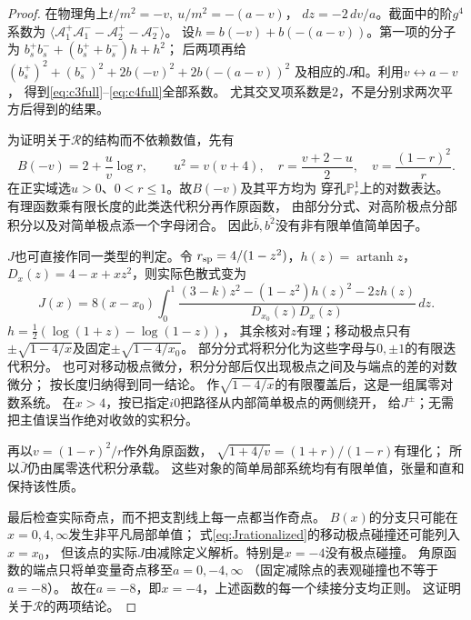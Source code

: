 \documentclass[11pt,a4paper]{ctexart}
\theoremstyle{cnplain}\newtheorem{theorem}{定理}[section]
\theoremstyle{definition}\newtheorem{definition}[theorem]{定义}
\theoremstyle{remark}\newtheorem{remark}[theorem]{注}
\begin{document}
\begin{proof}
在物理角上$t/m^2=-v,\ u/m^2=-(a-v)$，
$d z=-2\,dv/a$。截面中的阶$g^4$系数为
$\langle\mathcal A_1^+\mathcal A_1^--\mathcal A_2^+-\mathcal A_2^-\rangle$。
设$h=b(-v)+b(-(a-v))$。第一项的分子为
$b_s^+b_s^-+(b_s^++b_s^-)h+h^2$；
后两项再给$(b_s^+)^2+(b_s^-)^2+2b(-v)^2+2b(-(a-v))^2$
及相应的$J$和。利用$v\leftrightarrow a-v$，
得到\eqref{eq:c3full}--\eqref{eq:c4full}全部系数。
尤其交叉项系数是$2$，不是分别求两次平方后得到的结果。

为证明关于$\mathcal R$的结构而不依赖数值，先有
\[
 B(-v)=2+\frac uv\log r,\qquad
 u^2=v(v+4),\quad r=\frac{v+2-u}{2},\quad v=\frac{(1-r)^2}{r}.
\]
在正实域选$u>0$、$0<r\le1$。故$B(-v)$及其平方均为
穿孔$\mathbb P^1_r$上的对数表达。
有理函数乘有限长度的此类迭代积分再作原函数，
由部分分式、对高阶极点分部积分以及对简单极点添一个字母闭合。
因此$\bar b,\overline{b^2}$没有非有限单值简单因子。

$J$也可直接作同一类型的判定。令
$r_{\rm sp}=4/(1-z^2)$，$h(z)=\operatorname{artanh}z$，
$D_x(z)=4-x+xz^2$，则实际色散式变为
\begin{equation}\label{eq:Jrationalized}
 J(x)=8(x-x_0)\int_0^1
 \frac{(3-k)z^2-(1-z^2)h(z)^2-2zh(z)}
      {D_{x_0}(z)D_x(z)}\,dz .
\end{equation}
$h=\frac12(\log(1+z)-\log(1-z))$，
其余核对$z$有理；移动极点只有
$\pm\sqrt{1-4/x}$及固定$\pm\sqrt{1-4/x_0}$。
部分分式将积分化为这些字母与$0,\pm1$的有限迭代积分。
也可对移动极点微分，积分分部后仅出现极点之间及与端点的差的对数微分；
按长度归纳得到同一结论。
作$\sqrt{1-4/x}$的有限覆盖后，这是一组属零对数系统。
在$x>4$，按已指定$i0$把路径从内部简单极点的两侧绕开，
给$J^\pm$；无需把主值误当作绝对收敛的实积分。

再以$v=(1-r)^2/r$作外角原函数，
$\sqrt{1+4/v}=(1+r)/(1-r)$有理化；
所以$\bar J$仍由属零迭代积分承载。
这些对象的简单局部系统均有有限单值，张量和直和保持该性质。

最后检查实际奇点，而不把支割线上每一点都当作奇点。
$B(x)$的分支只可能在$x=0,4,\infty$发生非平凡局部单值；
式\eqref{eq:Jrationalized}的移动极点碰撞还可能列入$x=x_0$，
但该点的实际$J$由减除定义解析。特别是$x=-4$没有极点碰撞。
角原函数的端点只将单变量奇点移至$a=0,-4,\infty$
（固定减除点的表观碰撞也不等于$a=-8$）。
故在$a=-8$，即$x=-4$，上述函数的每一个续接分支均正则。
这证明关于$\mathcal R$的两项结论。
\end{proof}
\end{document}
